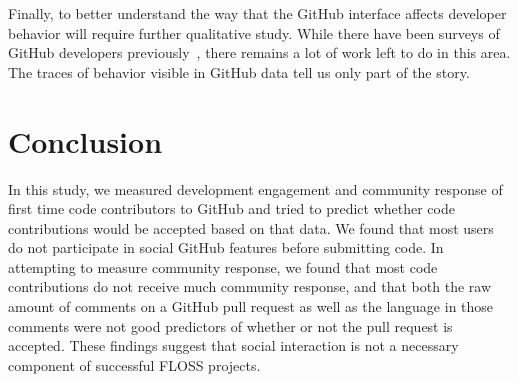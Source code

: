 \documentclass{sigchi}
\begin{document}
Finally, to better understand the way that the GitHub interface affects
developer behavior will require further qualitative study. While there have been
surveys of GitHub developers previously~\cite{mcdonald_performance_2013}, there
remains a lot of work left to do in this area. The traces of behavior visible in GitHub data tell us only part of the story.

\section{Conclusion}

In this study, we measured development engagement and community response of first
time code contributors to GitHub and tried to predict whether code contributions would be accepted based on that data. We found that most users do not
participate in social GitHub features before submitting code.  In
attempting to measure community response, we found that most code contributions
do not receive much community response, and that both the raw amount of comments
on a GitHub pull request as well as the language in those comments were not good
predictors of whether or not the pull request is accepted. These findings suggest that social interaction is not a necessary component of successful FLOSS projects.

%
%


\end{document}
